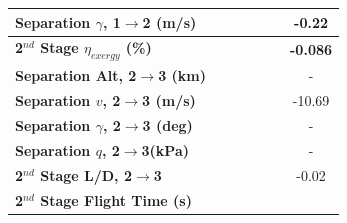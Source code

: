 \begin{table}[ht!]
\begin{tabular}{l c c c c c c}
		\textbf{Separation $\gamma$, 1$\rightarrow$2 (m/s)}
		& \firstsecondSeparationgammaCdNinetyNoReturn
		& \firstsecondSeparationgammaCdNinetyFiveNoReturn
		& \firstsecondSeparationgammaCdStandardNoReturn
		& \firstsecondSeparationgammaCdOneHundredFiveNoReturn
		& \firstsecondSeparationgammaCdOneHundredTenNoReturn
		&-0.22
		\\
		\hline 
		\textbf{2$^{nd}$ Stage $\eta_{exergy}$ (\%)}
		& \textbf{\secondExergyEffCdNinetyNoReturn}
		& \textbf{\secondExergyEffCdNinetyFiveNoReturn}
		& \textbf{\secondExergyEffCdStandardNoReturn}
		& \textbf{\secondExergyEffCdOneHundredFiveNoReturn}
		& \textbf{\secondExergyEffCdOneHundredTenNoReturn}
		& \textbf{-0.086}
		\\
		\textbf{Separation Alt, 2$\rightarrow$3 (km)}
		& \secondthirdSeparationAltCdNinetyNoReturn
		& \secondthirdSeparationAltCdNinetyFiveNoReturn
		& \secondthirdSeparationAltCdStandardNoReturn
		& \secondthirdSeparationAltCdOneHundredFiveNoReturn
		& \secondthirdSeparationAltCdOneHundredTenNoReturn
		& -
		\\
		\textbf{Separation $v$, 2$\rightarrow$3 (m/s)}
		& \secondthirdSeparationvCdNinetyNoReturn
		& \secondthirdSeparationvCdNinetyFiveNoReturn
		& \secondthirdSeparationvCdStandardNoReturn
		& \secondthirdSeparationvCdOneHundredFiveNoReturn
		& \secondthirdSeparationvCdOneHundredTenNoReturn
		&-10.69
		\\
		\textbf{Separation $\gamma$, 2$\rightarrow$3 (deg)}
		& \secondthirdSeparationgammaCdNinetyNoReturn
		& \secondthirdSeparationgammaCdNinetyFiveNoReturn
		& \secondthirdSeparationgammaCdStandardNoReturn
		& \secondthirdSeparationgammaCdOneHundredFiveNoReturn
		& \secondthirdSeparationgammaCdOneHundredTenNoReturn
		& -
		\\
		\textbf{Separation $q$, 2$\rightarrow$3(kPa)}
		& \secondthirdSeparationqCdNinetyNoReturn
		& \secondthirdSeparationqCdNinetyFiveNoReturn
		& \secondthirdSeparationqCdStandardNoReturn
		& \secondthirdSeparationqCdOneHundredFiveNoReturn
		& \secondthirdSeparationqCdOneHundredTenNoReturn
		& -
		\\
		\textbf{2$^{nd}$ Stage L/D, 2$\rightarrow$3}
		& \secondthirdSeparationLDCdNinetyNoReturn
		& \secondthirdSeparationLDCdNinetyFiveNoReturn
		& \secondthirdSeparationLDCdStandardNoReturn
		& \secondthirdSeparationLDCdOneHundredFiveNoReturn
		& \secondthirdSeparationLDCdOneHundredTenNoReturn
		&-0.02
		\\
		\textbf{2$^{nd}$ Stage Flight Time (s)}
		& \secondFlightTimeCdNinetyNoReturn
		& \secondFlightTimeCdNinetyFiveNoReturn

\end{tabular}
\end{table}
